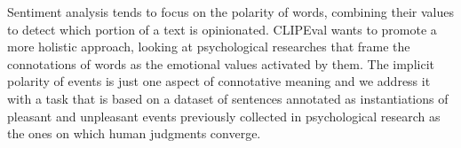 Sentiment analysis tends to focus on the polarity of words, combining their values to detect which portion of a text is opinionated. CLIPEval wants to promote a more holistic approach, looking at psychological researches that frame the connotations of words as the emotional values activated by them. The implicit polarity of events is just one aspect of connotative meaning and we address it with a task that is based on a dataset of sentences annotated as instantiations of pleasant and unpleasant events previously collected in psychological research as the ones on which human judgments converge.
